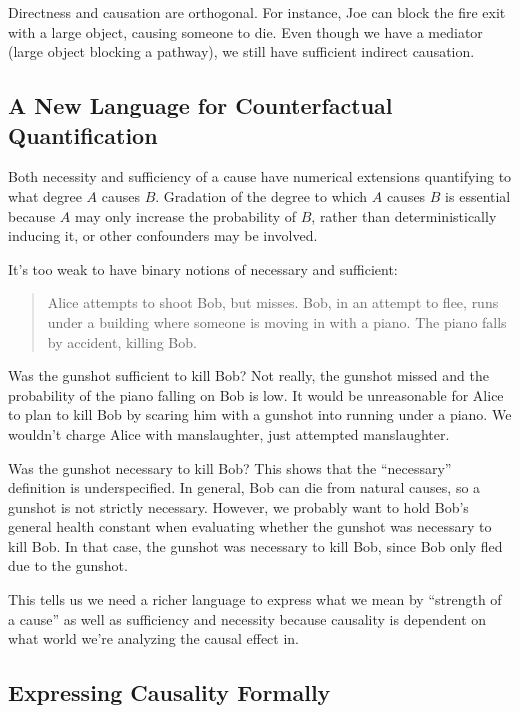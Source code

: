 \documentclass{article}
\begin{document}
Directness and causation are orthogonal. For instance, Joe can block the fire exit with a large object, causing someone to die. Even though we have a mediator (large object blocking a pathway), we still have sufficient indirect causation.

\subsection{A New Language for Counterfactual Quantification}

Both necessity and sufficiency of a cause have numerical extensions quantifying to what degree $A$ causes $B$. Gradation of the degree to which $A$ causes $B$ is essential because $A$ may only increase the probability of $B$, rather than deterministically inducing it, or other confounders may be involved.

It's too weak to have binary notions of necessary and sufficient:

\begin{quote}
  Alice attempts to shoot Bob, but misses. Bob, in an attempt to flee, runs under a building where someone is moving in with a piano. The piano falls by accident, killing Bob.
\end{quote}

Was the gunshot sufficient to kill Bob? Not really, the gunshot missed and the probability of the piano falling on Bob is low. It would be unreasonable for Alice to plan to kill Bob by scaring him with a gunshot into running under a piano. We wouldn't charge Alice with manslaughter, just attempted manslaughter.

Was the gunshot necessary to kill Bob? This shows that the ``necessary'' definition is underspecified. In general, Bob can die from natural causes, so a gunshot is not strictly necessary. However, we probably want to hold Bob's general health constant when evaluating whether the gunshot was necessary to kill Bob. In that case, the gunshot was necessary to kill Bob, since Bob only fled due to the gunshot.

This tells us we need a richer language to express what we mean by ``strength of a cause'' as well as sufficiency and necessity because causality is dependent on what world we're analyzing the causal effect in.

\subsection{Expressing Causality Formally}
\end{document}
